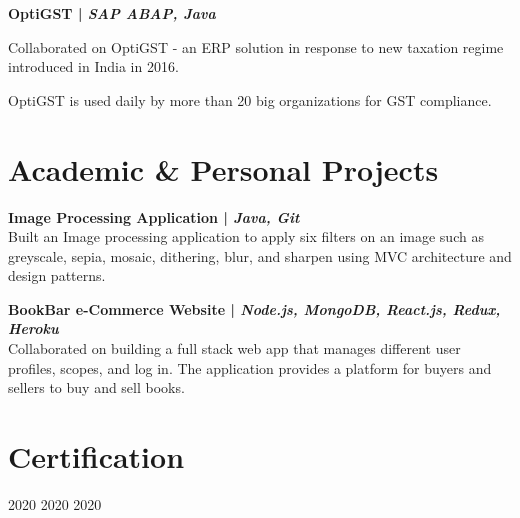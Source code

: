 \documentclass[]{deedy-resume-openfont}
\begin{document}
\begin{minipage}[t]{0.66\textwidth}
\textbf{OptiGST | \emph{SAP ABAP, Java } }
\begin{tightemize}

\item Collaborated on OptiGST - an ERP solution in response to new taxation regime introduced in India in 2016. 
\item OptiGST is used daily by more than 20 big organizations for GST compliance.


\end{tightemize}
\sectionsep



\section{Academic \& Personal Projects}
\textbf{Image Processing Application | \emph{Java, Git}} \\
Built an Image processing application to apply six filters on an image such as greyscale, sepia, mosaic, dithering, blur, and sharpen using MVC architecture and design patterns. 
\sectionsep


\textbf{BookBar e-Commerce Website | \emph {Node.js, MongoDB, React.js, Redux, Heroku}}\\
Collaborated on building a full stack web app that manages different user profiles, scopes, and log in. The application provides a platform for buyers and sellers to buy and sell books.
\sectionsep


\section{Certification} 
2020	      
2020	     
2020	     
\sectionsep


% 
% 

\end{minipage} 
\end{document}
